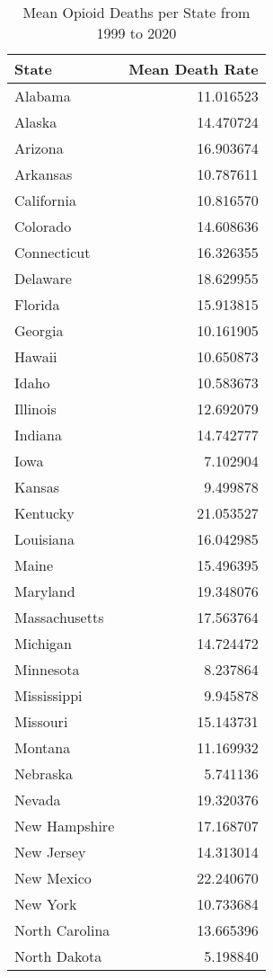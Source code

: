 \begin{table}\centering
\caption{Mean Opioid Deaths per State from 1999 to 2020}
\label{}
\begin{tabular}[t]{l|r}
\hline
State & Mean Death Rate\\
\hline
Alabama & 11.016523\\
\hline
Alaska & 14.470724\\
\hline
Arizona & 16.903674\\
\hline
Arkansas & 10.787611\\
\hline
California & 10.816570\\
\hline
Colorado & 14.608636\\
\hline
Connecticut & 16.326355\\
\hline
Delaware & 18.629955\\
\hline
Florida & 15.913815\\
\hline
Georgia & 10.161905\\
\hline
Hawaii & 10.650873\\
\hline
Idaho & 10.583673\\
\hline
Illinois & 12.692079\\
\hline
Indiana & 14.742777\\
\hline
Iowa & 7.102904\\
\hline
Kansas & 9.499878\\
\hline
Kentucky & 21.053527\\
\hline
Louisiana & 16.042985\\
\hline
Maine & 15.496395\\
\hline
Maryland & 19.348076\\
\hline
Massachusetts & 17.563764\\
\hline
Michigan & 14.724472\\
\hline
Minnesota & 8.237864\\
\hline
Mississippi & 9.945878\\
\hline
Missouri & 15.143731\\
\hline
Montana & 11.169932\\
\hline
Nebraska & 5.741136\\
\hline
Nevada & 19.320376\\
\hline
New Hampshire & 17.168707\\
\hline
New Jersey & 14.313014\\
\hline
New Mexico & 22.240670\\
\hline
New York & 10.733684\\
\hline
North Carolina & 13.665396\\
\hline
North Dakota & 5.198840\\

\end{tabular}
\end{table}

